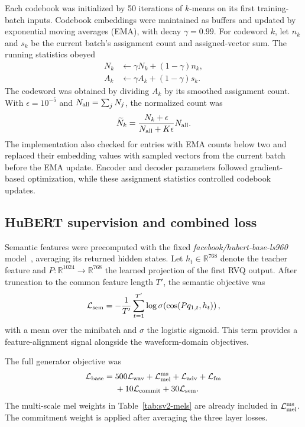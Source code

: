 Each codebook was initialized by 50 iterations of $k$-means on its first training-batch inputs. Codebook embeddings were maintained as buffers and updated by exponential moving averages (EMA), with decay $\gamma=0.99$. For codeword $k$, let $n_k$ and $s_k$ be the current batch's assignment count and assigned-vector sum. The running statistics obeyed
\begin{align}
 N_k&\leftarrow\gamma N_k+(1-\gamma)n_k,\nonumber\\
 A_k&\leftarrow\gamma A_k+(1-\gamma)s_k.
 \label{eq:sv2-ema}
\end{align}
The codeword was obtained by dividing $A_k$ by its smoothed assignment count. With $\epsilon=10^{-5}$ and $N_{\rm all}=\sum_jN_j$, the normalized count was
\begin{equation}
 \widetilde N_k=
 \frac{N_k+\epsilon}{N_{\rm all}+K\epsilon}N_{\rm all}.
 \label{eq:sv2-ema-count}
\end{equation}
The implementation also checked for entries with EMA counts below two and replaced their embedding values with sampled vectors from the current batch before the EMA update. Encoder and decoder parameters followed gradient-based optimization, while these assignment statistics controlled codebook updates.

\subsection{HuBERT supervision and combined loss}
Semantic features were precomputed with the fixed \textit{facebook/hubert-base-ls960} model~\cite{hubert}, averaging its returned hidden states. Let $h_t\in\mathbb{R}^{768}$ denote the teacher feature and $P:\mathbb{R}^{1024}\rightarrow\mathbb{R}^{768}$ the learned projection of the first RVQ output. After truncation to the common feature length $T'$, the semantic objective was
\begin{equation}
 \mathcal L_{\rm sem}
 =-\frac{1}{T'}\sum_{t=1}^{T'}
       \log\sigma\!\left(\cos(Pq_{1,t},h_t)\right),
 \label{eq:sv2-sem}
\end{equation}
with a mean over the minibatch and $\sigma$ the logistic sigmoid. This term provides a feature-alignment signal alongside the waveform-domain objectives.

The full generator objective was
\begin{equation}
\begin{split}
 \mathcal L_{\rm base}={}&
 500\mathcal L_{\rm wav}
 +\mathcal L_{\rm mel}^{\rm ms}
 +\mathcal L_{\rm adv}+\mathcal L_{\rm fm}\\
 &+10\mathcal L_{\rm commit}+30\mathcal L_{\rm sem}.
\end{split}
\label{eq:sv2-base}
\end{equation}
The multi-scale mel weights in Table~\ref{tab:sv2-mels} are already included in $\mathcal L_{\rm mel}^{\rm ms}$. The commitment weight is applied after averaging the three layer losses.

